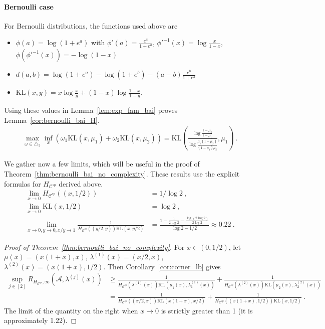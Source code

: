 \documentclass{article}
\newcommand{\KL}{\mathrm{KL}}
\begin{document}
\paragraph{Bernoulli case}
For Bernoulli distributions, the functions used above are
\begin{itemize}
	\item $\phi(a) = \log (1 + e^a)$ with $\phi'(a) = \frac{e^a}{1 + e^a}$, $\phi'^{-1}(x) = \log \frac{x}{1 - x}$, $\phi(\phi'^{-1}(x)) = - \log (1 - x)$
	\item $d(a, b) = \log(1 + e^a) - \log(1 + e^b) - (a - b) \frac{e^b}{1 + e^b}$
	\item $\KL(x, y) = x \log \frac{x}{y} + (1-x) \log \frac{1-x}{1-y}$.
\end{itemize}

Using these values in Lemma~\ref{lem:exp_fam_bai} proves Lemma~\ref{cor:bernoulli_bai_H}.
\begin{align*}
\max_{\omega \in \triangle_2} \inf_{x} (\omega_1 \KL(x, \mu_1) + \omega_2 \KL(x, \mu_2))
= \KL \left( \frac{\log\frac{1 - \mu_2}{1 - \mu_1}}{\log \frac{\mu_1(1 - \mu_2)}{(1 - \mu_1)\mu_2}}, \mu_1 \right)
\: .
\end{align*}

We gather now a few limits, which will be useful in the proof of Theorem~\ref{thm:bernoulli_bai_no_complexity}. These results use the explicit formulas for $H_{\mathcal C^{sp}}$ derived above.
\begin{align*}
\lim_{x \to 0} H_{\mathcal C^{sp}}((x, 1/2))
&= 1/\log 2
\: , \\
\lim_{x \to 0} \KL(x, 1/2)
&= \log 2
\: , \\
\lim_{x \to 0, y \to 0, x/y \to 1} \frac{1}{H_{\mathcal C^{sp}}((y/2, y)) \KL(x, y/2)}
&= \frac{1 -  \frac{1}{2 \log 2} - \frac{\log(2 \log 2)}{2 \log 2}}{\log 2 - 1/2} \approx 0.22
\: .
\end{align*}

\begin{proof}[Proof of Theorem~\ref{thm:bernoulli_bai_no_complexity}]
For $x \in (0,1/2)$, let $\mu(x) = (x(1+x), x)$, $\lambda^{(1)}(x) = (x/2, x)$, $\lambda^{(2)}(x) = (x(1+x), 1/2)$. Then Corollary~\ref{cor:corner_lb} gives
\begin{align*}
\sup_{j \in [2]} R_{H_{\mathcal C^{sp}}, \infty}(\mathcal A, \lambda^{(j)}(x))
&\ge \frac{1}{H_{\mathcal C^{sp}}(\lambda^{(1)}(x))\KL(\mu_1(x), \lambda^{(1)}_1(x))} + \frac{1}{H_{\mathcal C^{sp}}(\lambda^{(2)}(x))\KL(\mu_2(x), \lambda^{(2)}_2(x))}
\\
&= \frac{1}{H_{\mathcal C^{sp}}((x/2, x)) \KL(x(1+x), x/2)} + \frac{1}{H_{\mathcal C^{sp}}((x(1+x), 1/2))\KL(x, 1/2)}
\: .
\end{align*}
The limit of the quantity on the right when $x \to 0$ is strictly greater than 1 (it is approximately 1.22).
\end{proof}
\end{document}
